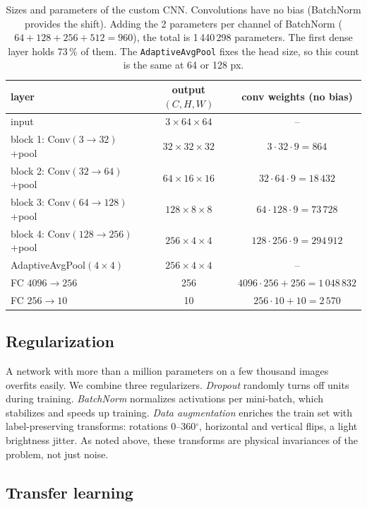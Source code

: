 \documentclass[11pt,a4paper]{article}
\newcommand{\cnnparams}{1\,440\,298}
\newcommand{\code}[1]{\texttt{#1}}
\begin{document}
\begin{table}[h]
\centering
\small
\begin{tabular}{lcc}
\toprule
layer & output $(C,H,W)$ & conv weights (no bias) \\
\midrule
input & $3\times64\times64$ & -- \\
block 1: Conv$(3\to32)$+pool & $32\times32\times32$ & $3\cdot32\cdot9 = 864$ \\
block 2: Conv$(32\to64)$+pool & $64\times16\times16$ & $32\cdot64\cdot9 = 18\,432$ \\
block 3: Conv$(64\to128)$+pool & $128\times8\times8$ & $64\cdot128\cdot9 = 73\,728$ \\
block 4: Conv$(128\to256)$+pool & $256\times4\times4$ & $128\cdot256\cdot9 = 294\,912$ \\
AdaptiveAvgPool$(4\times4)$ & $256\times4\times4$ & -- \\
FC $4096\to256$ & 256 & $4096\cdot256+256 = 1\,048\,832$ \\
FC $256\to10$ & 10 & $256\cdot10+10 = 2\,570$ \\
\bottomrule
\end{tabular}
\caption{Sizes and parameters of the custom CNN. Convolutions have no bias (BatchNorm
provides the shift). Adding the 2 parameters per channel of BatchNorm
($64+128+256+512 = 960$), the total is \cnnparams{} parameters. The first dense layer holds
73\,\% of them. The \code{AdaptiveAvgPool} fixes the head size, so this count is the same at
64 or 128 px.}
\label{tab:dims}
\end{table}

\subsection{Regularization}

A network with more than a million parameters on a few thousand images overfits easily. We
combine three regularizers. \emph{Dropout} randomly turns off units during training.
\emph{BatchNorm} normalizes activations per mini-batch, which stabilizes and speeds up
training. \emph{Data augmentation} enriches the train set with label-preserving transforms:
rotations 0--360$^\circ$, horizontal and vertical flips, a light brightness jitter. As noted
above, these transforms are physical invariances of the problem, not just noise.

\subsection{Transfer learning}
\end{document}
